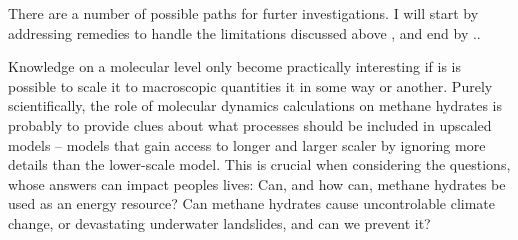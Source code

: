 There are a number of possible paths for furter investigations. I will start by addressing remedies to handle the limitations discussed above , and end by ..


Knowledge on a molecular level only become practically interesting if is is possible to scale it to macroscopic quantities it in some way or another. Purely scientifically, the role of molecular dynamics calculations on methane hydrates is probably to provide clues about what processes should be included in upscaled models -- models that gain access to longer and larger scaler by ignoring more details than the lower-scale model. This is crucial when considering the questions, whose answers can impact peoples lives: Can, and how can, methane hydrates be used as an energy resource? Can methane hydrates cause uncontrolable climate change, or devastating underwater landslides, and can we prevent it? 